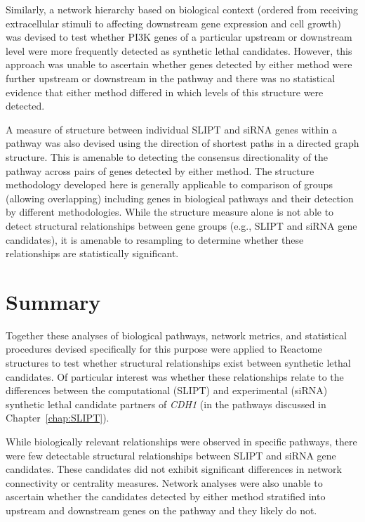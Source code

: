 Similarly, a network hierarchy based on biological context (ordered from receiving extracellular stimuli to affecting downstream \gls{gene expression} and cell growth) was devised to test whether \gls{PI3K} genes of a particular upstream or downstream level were more frequently detected as \gls{synthetic lethal} candidates. However, this approach was unable to ascertain whether genes detected by either method were further upstream or downstream in the pathway and there was no statistical evidence that either method differed in which levels of this structure were detected.

A measure of  structure between individual \gls{SLIPT} and \gls{siRNA} genes within a pathway was also devised using the direction of \glspl{shortest path} in a directed \gls{graph} structure. This is amenable to detecting the consensus directionality of the pathway across pairs of genes detected by either method. The  structure methodology developed here is generally applicable to comparison of  groups (allowing overlapping) including genes in biological pathways and their detection by different methodologies. While the  structure measure alone is not able to detect structural relationships between gene groups (e.g., \gls{SLIPT} and \gls{siRNA} gene candidates), it is amenable to resampling to determine whether these relationships are statistically significant.

\section{Summary}

Together these analyses of biological pathways, network metrics, and statistical procedures devised specifically for this purpose were applied to Reactome  structures to test whether structural relationships exist between \gls{synthetic lethal} candidates. Of particular interest was whether these relationships relate to the differences between the computational (\gls{SLIPT}) and experimental (\gls{siRNA}) \gls{synthetic lethal} candidate partners of \textit{CDH1} (in the pathways discussed in Chapter~\ref{chap:SLIPT}).

While biologically relevant relationships were observed in specific pathways, there were few detectable structural relationships between \gls{SLIPT} and \gls{siRNA} gene candidates. These candidates did not exhibit significant differences in network connectivity or \gls{centrality} measures. Network analyses were also unable to ascertain whether the candidates detected by either method stratified into upstream and downstream genes on the pathway and they likely do not.

